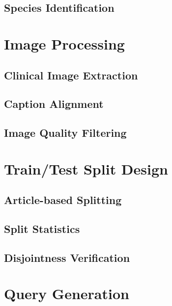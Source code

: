 \subsection{Species Identification}
\label{subsec:dataset:curation:species}

%
%
\section{Image Processing}
\label{sec:dataset:images}

\subsection{Clinical Image Extraction}
\label{subsec:dataset:images:extraction}

\subsection{Caption Alignment}
\label{subsec:dataset:images:captions}

\subsection{Image Quality Filtering}
\label{subsec:dataset:images:quality}

%
%
\section{Train/Test Split Design}
\label{sec:dataset:split}

\subsection{Article-based Splitting}
\label{subsec:dataset:split:article}

\subsection{Split Statistics}
\label{subsec:dataset:split:statistics}

\subsection{Disjointness Verification}
\label{subsec:dataset:split:verification}

%
%
\section{Query Generation}
\label{sec:dataset:queries}

